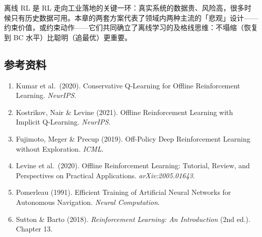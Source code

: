\documentclass{article}
\begin{document}
离线 RL 是 RL 走向工业落地的关键一环：真实系统的数据贵、风险高，很多时候只有历史数据可用。本章的两套方案代表了领域内两种主流的「悲观」设计——约束价值，或约束动作——它们共同确立了离线学习的及格线思维：不塌缩（恢复到 BC 水平）比聪明（追最优）更重要。

\subsection*{参考资料}

\begin{enumerate}
  \item Kumar et al.\ (2020). Conservative Q-Learning for Offline Reinforcement Learning. \textit{NeurIPS}.
  \item Kostrikov, Nair \& Levine (2021). Offline Reinforcement Learning with Implicit Q-Learning. \textit{NeurIPS}.
  \item Fujimoto, Meger \& Precup (2019). Off-Policy Deep Reinforcement Learning without Exploration. \textit{ICML}.
  \item Levine et al.\ (2020). Offline Reinforcement Learning: Tutorial, Review, and Perspectives on Practical Applications. \textit{arXiv:2005.01643}.
  \item Pomerleau (1991). Efficient Training of Artificial Neural Networks for Autonomous Navigation. \textit{Neural Computation}.
  \item Sutton \& Barto (2018). \textit{Reinforcement Learning: An Introduction} (2nd ed.). Chapter 13.
\end{enumerate}
\end{document}
